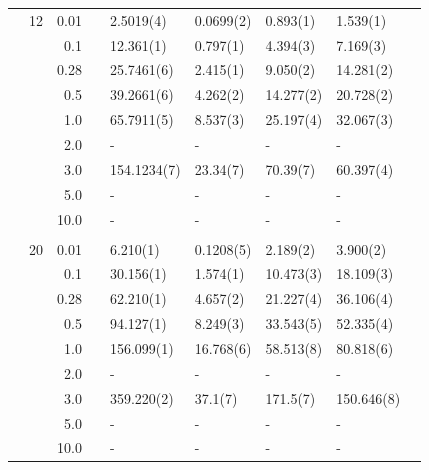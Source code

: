 \begin{table}
\begin{tabularx}{\textwidth}{R{1cm}rrcR{2.3cm}R{2.3cm}R{2.3cm}R{2.3cm}R{1cm}}
		&12 & 0.01 && 2.5019(4) & 0.0699(2) & 0.893(1) & 1.539(1) \\
		&& 0.1 && 12.361(1) & 0.797(1) & 4.394(3) & 7.169(3) \\
		&& 0.28 && 25.7461(6) & 2.415(1) & 9.050(2) & 14.281(2) \\
		&& 0.5 && 39.2661(6) & 4.262(2) & 14.277(2) & 20.728(2) \\
		&& 1.0 && 65.7911(5) & 8.537(3) & 25.197(4) & 32.067(3) \\
		&& 2.0 && - & - & - & -\\
		&& 3.0 && 154.1234(7) & 23.34(7) & 70.39(7) & 60.397(4) \\ 
		&& 5.0 && - & - & - & -\\
		&& 10.0 && - & - & - & -\\
		\hdashline \\
		
		&20 & 0.01 && 6.210(1) & 0.1208(5) & 2.189(2) & 3.900(2) \\
		&& 0.1 && 30.156(1) & 1.574(1) & 10.473(3) & 18.109(3) \\
		&& 0.28 && 62.210(1) & 4.657(2) & 21.227(4) & 36.106(4) \\
		&& 0.5 && 94.127(1) & 8.249(3) & 33.543(5) & 52.335(4) \\
		&& 1.0 && 156.099(1) & 16.768(6) & 58.513(8) & 80.818(6) \\
		&& 2.0 && - & - & - & -\\
		&& 3.0 && 359.220(2) & 37.1(7) & 171.5(7) & 150.646(8) \\ 
		&& 5.0 && - & - & - & -\\
		&& 10.0 && - & - & - & -\\
		\hline \hline
	\end{tabularx}
\end{table} 

